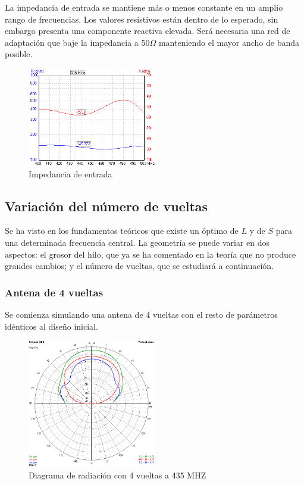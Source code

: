 \documentclass[12pt]{article}
\begin{document}
La impedancia de entrada se mantiene más o menos constante en un amplio rango de frecuencias. Los valores resistivos están dentro de lo esperado, sin embargo presenta una componente reactiva elevada. Será necesaria una red de adaptación que baje la impedancia a 50$\Omega$ manteniendo el mayor ancho de banda posible.\\

\begin{figure}[!h]
	\centering
	\includegraphics[width=0.5\textwidth]{zin.png}
	\caption{Impedancia de entrada}
\end{figure}

\subsection{Variación del número de vueltas}
Se ha visto en los fundamentos teóricos que existe un óptimo de $L$ y de $S$ para una determinada frecuencia central. La geometría se puede variar en dos aspectos: el grosor del hilo, que ya se ha comentado en la teoría que no produce grandes cambios; y el número de vueltas, que se estudiará a continuación.

\subsubsection*{Antena de 4 vueltas}
Se comienza simulando una antena de 4 vueltas con el resto de parámetros idénticos al diseño inicial.\\

\begin{figure}[H]
	\centering
	\includegraphics[width=0.5\textwidth]{helix_4_435_gain.png}
	\caption{Diagrama de radiación con 4 vueltas a 435 MHZ}
\end{figure}
\end{document}
